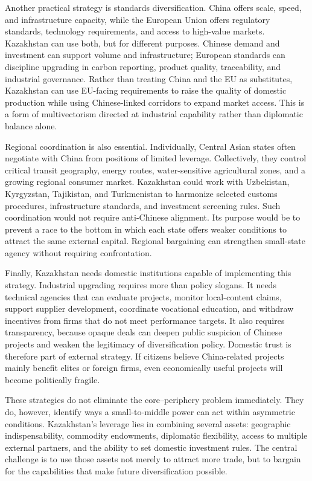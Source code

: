 \documentclass[12pt]{article}
\begin{document}
Another practical strategy is standards diversification. China offers scale, speed, and infrastructure capacity, while the European Union offers regulatory standards, technology requirements, and access to high-value markets. Kazakhstan can use both, but for different purposes. Chinese demand and investment can support volume and infrastructure; European standards can discipline upgrading in carbon reporting, product quality, traceability, and industrial governance. Rather than treating China and the EU as substitutes, Kazakhstan can use EU-facing requirements to raise the quality of domestic production while using Chinese-linked corridors to expand market access. This is a form of multivectorism directed at industrial capability rather than diplomatic balance alone.

Regional coordination is also essential. Individually, Central Asian states often negotiate with China from positions of limited leverage. Collectively, they control critical transit geography, energy routes, water-sensitive agricultural zones, and a growing regional consumer market. Kazakhstan could work with Uzbekistan, Kyrgyzstan, Tajikistan, and Turkmenistan to harmonize selected customs procedures, infrastructure standards, and investment screening rules. Such coordination would not require anti-Chinese alignment. Its purpose would be to prevent a race to the bottom in which each state offers weaker conditions to attract the same external capital. Regional bargaining can strengthen small-state agency without requiring confrontation.

Finally, Kazakhstan needs domestic institutions capable of implementing this strategy. Industrial upgrading requires more than policy slogans. It needs technical agencies that can evaluate projects, monitor local-content claims, support supplier development, coordinate vocational education, and withdraw incentives from firms that do not meet performance targets. It also requires transparency, because opaque deals can deepen public suspicion of Chinese projects and weaken the legitimacy of diversification policy. Domestic trust is therefore part of external strategy. If citizens believe China-related projects mainly benefit elites or foreign firms, even economically useful projects will become politically fragile.

These strategies do not eliminate the core--periphery problem immediately. They do, however, identify ways a small-to-middle power can act within asymmetric conditions. Kazakhstan's leverage lies in combining several assets: geographic indispensability, commodity endowments, diplomatic flexibility, access to multiple external partners, and the ability to set domestic investment rules. The central challenge is to use those assets not merely to attract more trade, but to bargain for the capabilities that make future diversification possible.
\end{document}
